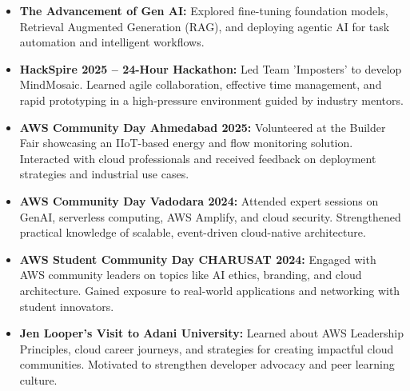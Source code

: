 \documentclass[10pt,a4paper]{article}
\begin{document}
\begin{itemize}[leftmargin=*]
    \item \textbf{The Advancement of Gen AI:} Explored fine-tuning foundation models, Retrieval Augmented Generation (RAG), and deploying agentic AI for task automation and intelligent workflows.

    \item \textbf{HackSpire 2025 – 24-Hour Hackathon:} Led Team 'Imposters' to develop MindMosaic. Learned agile collaboration, effective time management, and rapid prototyping in a high-pressure environment guided by industry mentors.

    \item \textbf{AWS Community Day Ahmedabad 2025:} Volunteered at the Builder Fair showcasing an IIoT-based energy and flow monitoring solution. Interacted with cloud professionals and received feedback on deployment strategies and industrial use cases.

    \item \textbf{AWS Community Day Vadodara 2024:} Attended expert sessions on GenAI, serverless computing, AWS Amplify, and cloud security. Strengthened practical knowledge of scalable, event-driven cloud-native architecture.

    \item \textbf{AWS Student Community Day CHARUSAT 2024:} Engaged with AWS community leaders on topics like AI ethics, branding, and cloud architecture. Gained exposure to real-world applications and networking with student innovators.

    \item \textbf{Jen Looper’s Visit to Adani University:} Learned about AWS Leadership Principles, cloud career journeys, and strategies for creating impactful cloud communities. Motivated to strengthen developer advocacy and peer learning culture.
\end{itemize}
\end{document}
